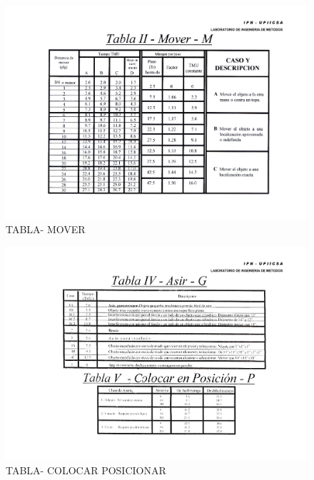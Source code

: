     \begin{figure}
        \centering
        \includegraphics[trim = {0mm 0mm 0mm 15mm},clip,scale=0.3]{24/Img/tablaMover.pdf}
        \caption{TABLA- MOVER}
        \label{fig:Mover}
    \end{figure}
    \begin{figure}
        \centering
        \includegraphics[trim = {0mm 0mm 0mm 13mm},clip,scale=0.3]{24/Img/tablaColocarPosicion.pdf}
        \caption{TABLA- COLOCAR POSICIONAR}
        \label{fig:COLOCAR}
    \end{figure}
